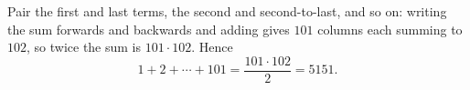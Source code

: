 Pair the first and last terms, the second and second-to-last, and so on: writing the sum forwards and backwards and adding gives $101$ columns each summing to $102$, so twice the sum is $101\cdot102$. Hence
\[1+2+\cdots+101=\dfrac{101\cdot102}{2}=\boxed{5151}.\]
